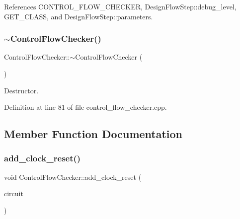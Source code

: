 References C\+O\+N\+T\+R\+O\+L\+\_\+\+F\+L\+O\+W\+\_\+\+C\+H\+E\+C\+K\+ER, Design\+Flow\+Step\+::debug\+\_\+level, G\+E\+T\+\_\+\+C\+L\+A\+SS, and Design\+Flow\+Step\+::parameters.

\mbox{\label{classControlFlowChecker_a98263e2a12532dcd9a9ea377cfe64dfd}} 
\subsubsection{\texorpdfstring{$\sim$\+Control\+Flow\+Checker()}{~ControlFlowChecker()}}
{\footnotesize\ttfamily Control\+Flow\+Checker\+::$\sim$\+Control\+Flow\+Checker (\begin{DoxyParamCaption}{ }\end{DoxyParamCaption})\hspace{0.3cm}{\ttfamily [virtual]}}



Destructor. 



Definition at line 81 of file control\+\_\+flow\+\_\+checker.\+cpp.



\subsection{Member Function Documentation}
\mbox{\label{classControlFlowChecker_a0871b9dfdf0f1875f8e61da585bdc2f3}} 
\subsubsection{\texorpdfstring{add\+\_\+clock\+\_\+reset()}{add\_clock\_reset()}}
{\footnotesize\ttfamily void Control\+Flow\+Checker\+::add\+\_\+clock\+\_\+reset (\begin{DoxyParamCaption}\item[{\hyperlink{structural__objects_8hpp_a8ea5f8cc50ab8f4c31e2751074ff60b2}{structural\+\_\+object\+Ref}}]{circuit }\end{DoxyParamCaption})\hspace{0.3cm}{\ttfamily [protected]}}

